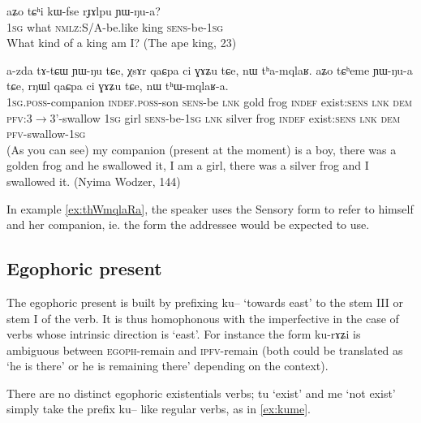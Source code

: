 \documentclass[oldfontcommands,oneside,a4paper,11pt]{article}
\newcommand{\ipa}[1]{{\phon \mbox{#1}}} %
\begin{document}
\begin{exe}
\ex \label{ex:mtChi.kWfse.rJAlpu}
\gll
\ipa{aʑo}  	\ipa{tɕʰi}  	\ipa{kɯ-fse}  	\ipa{rɟɤlpu}  	\ipa{ɲɯ-ŋu-a?}  \\
\textsc{1sg} what \textsc{nmlz}:S/A-be.like king \textsc{sens}-be-\textsc{1sg} \\
\glt What kind of a king am I? (The ape  king, 23)
\end{exe}


\begin{exe}
\ex \label{ex:thWmqlaRa}
\gll
\ipa{a-zda}  	\ipa{tɤ-tɕɯ}  	\ipa{ɲɯ-ŋu}  	\ipa{tɕe,}  	\ipa{χsɤr}  	\ipa{qaɕpa}  	\ipa{ci}  	\ipa{ɣɤʑu}  	\ipa{tɕe,}  	\ipa{nɯ}  	\ipa{tʰa-mqlaʁ.} \ipa{aʑo}  	\ipa{tɕʰeme}  	\ipa{ɲɯ-ŋu-a}  	\ipa{tɕe,}  	\ipa{rŋɯl}  	\ipa{qaɕpa}  	\ipa{ci}  	\ipa{ɣɤʑu}  	\ipa{tɕe,}  	\ipa{nɯ}  	\ipa{tʰɯ-mqlaʁ-a.}  \\
\textsc{1sg.poss}-companion \textsc{indef.poss}-son \textsc{sens}-be  \textsc{lnk} gold frog \textsc{indef} exist:\textsc{sens} \textsc{lnk} \textsc{dem} \textsc{pfv}:3$\rightarrow$3'-swallow \textsc{1sg} girl \textsc{sens}-be-\textsc{1sg}  \textsc{lnk} silver frog \textsc{indef} exist:\textsc{sens} \textsc{lnk} \textsc{dem} \textsc{pfv}-swallow-\textsc{1sg} \\
\glt (As you can see) my companion (present at the moment) is a boy, there was a golden frog and he swallowed it, I am a girl, there was a silver frog and I swallowed it. (Nyima Wodzer, 144)
\end{exe}

In example \ref{ex:thWmqlaRa}, the speaker uses the Sensory form to refer to himself and her companion, ie. the form the addressee would be expected to use. 


\subsection{Egophoric present } \label{sec:egoph}
The egophoric present  is built by prefixing \ipa{ku--} `towards east' to the stem III or stem I of the verb. It is thus homophonous with the imperfective in the case of verbs whose intrinsic direction is `east'.  For instance the form \ipa{ku-rɤʑi} is ambiguous between \textsc{egoph}-remain and \textsc{ipfv}-remain (both could be translated as `he is there' or he is remaining there' depending on the context).

There are no distinct egophoric existentials verbs; \ipa{tu} `exist' and \ipa{me}  `not exist' simply take the prefix \ipa{ku--} like regular verbs, as in \ref{ex:kume}.
\end{document}
